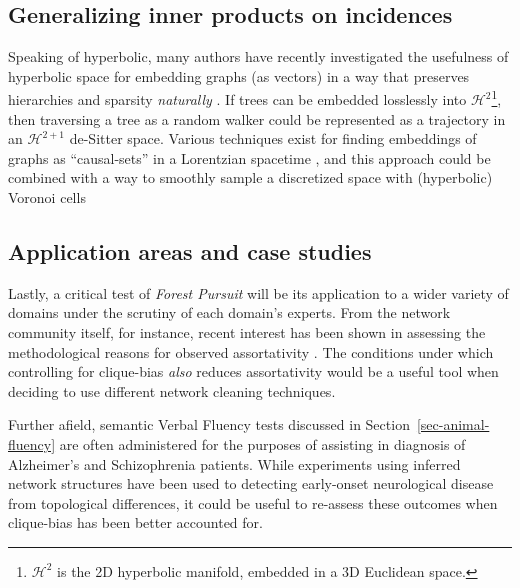 \documentclass[%
	12pt,
		oneside,
		letterpaper
]{book}
\begin{document}
\subsection{Generalizing inner products on incidences}\label{sec-future-hyperbolic}

Speaking of hyperbolic, many authors have recently investigated the usefulness of hyperbolic space for embedding graphs (as vectors) in a way that preserves hierarchies and sparsity \emph{naturally} \autocite{TreesContinuousEmbeddings_Chami2020,HyperbolicEntailmentCones_Ganea2018,LearningContinuousHierarchies_Nickel2018,RepresentationTradeoffsHyperbolic_Sala2018,Socialcentralizationsemantic_Linzhuo2020}.
If trees can be embedded losslessly \autocite{LowDistortionDelaunay_Sarkar2012} into \(\mathcal{H}^2\)\footnote{
  \(\mathcal{H}^2\) is the 2D hyperbolic manifold, embedded in a 3D Euclidean space.}, then traversing a tree as a random walker could be represented as a trajectory in an \(\mathcal{H}^{2+1}\) de-Sitter space.
Various techniques exist for finding embeddings of graphs as ``causal-sets'' in a Lorentzian spacetime \autocite{EmbeddinggraphsLorentzian_Clough2017}, and this approach could be combined with a way to smoothly sample a discretized space with (hyperbolic) Voronoi cells \autocite{HyperbolicVoronoiDiagrams_Nielsen2010,SemiDiscreteNormalizing_Chen2022}

\subsection{Application areas and case studies}\label{application-areas-and-case-studies}

Lastly, a critical test of \emph{Forest Pursuit} will be its application to a wider variety of domains under the scrutiny of each domain's experts.
From the network community itself, for instance, recent interest has been shown in assessing the methodological reasons for observed assortativity \autocite{PerceivedAssortativitySocial_Fisher2017}.
The conditions under which controlling for clique-bias \emph{also} reduces assortativity would be a useful tool when deciding to use different network cleaning techniques.

Further afield, semantic Verbal Fluency tests discussed in Section~\ref{sec-animal-fluency} are often administered for the purposes of assisting in diagnosis of Alzheimer's and Schizophrenia patients.
While experiments using inferred network structures \autocite{newdissimilaritymeasure_Prescott2006,Semanticverbalfluency_AriasTrejo2021} have been used to detecting early-onset neurological disease from topological differences, it could be useful to re-assess these outcomes when clique-bias has been better accounted for.
\end{document}
